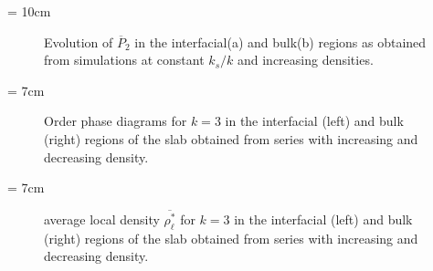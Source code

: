 \picW = 10cm
\begin{figure}
	\centering
	\caption{Evolution of $\overline{P}_2$ in the interfacial(a) and bulk(b) regions as
	obtained from simulations at constant $k_s/k$ and increasing densities.}
	\label{fig:P2Wa-rho_fd}
\end{figure}

\picW = 7cm
\begin{figure}
	\centering
	\caption{Order phase diagrams for $k=3$ in the interfacial (left) and bulk (right) regions of the
	slab obtained from series with increasing and decreasing density.}
	\label{fig:P2PhaseDia_k3}
\end{figure}

\picW = 7cm
\begin{figure}
	\centering
	\caption{average local density $\overline{\rho^{*}_\ell}$ for $k=3$ 
	in the interfacial (left) and bulk (right) regions of the
	slab obtained from series with increasing and decreasing density.}
	\label{fig:rhoLPhaseDia_k3}
\end{figure}


%	



